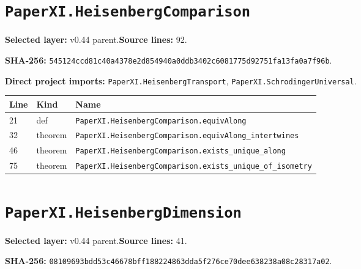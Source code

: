 \documentclass[10pt,oneside]{book}
\begin{document}
\section{\texorpdfstring{\nolinkurl{PaperXI.HeisenbergComparison}}{PaperXI.HeisenbergComparison}}\label{module:PaperXI.HeisenbergComparison}

\textbf{Selected layer:} v0.44 parent.\quad\textbf{Source lines:} 92.\par\textbf{SHA-256:} {\scriptsize\nolinkurl{545124ccd81c40a4378e2d854940a0ddb3402c6081775d92751fa13fa0a7f96b}}.


\textbf{Direct project imports:} \nolinkurl{PaperXI.HeisenbergTransport}, \nolinkurl{PaperXI.SchrodingerUniversal}.

\begin{longtable}{@{}p{}p{}p{}@{}}\toprule Line&Kind&Name\\\midrule\endhead

21&def&\nolinkurl{PaperXI.HeisenbergComparison.equivAlong}\\

32&theorem&\nolinkurl{PaperXI.HeisenbergComparison.equivAlong_intertwines}\\

46&theorem&\nolinkurl{PaperXI.HeisenbergComparison.exists_unique_along}\\

75&theorem&\nolinkurl{PaperXI.HeisenbergComparison.exists_unique_of_isometry}\\

\bottomrule\end{longtable}

\section{\texorpdfstring{\nolinkurl{PaperXI.HeisenbergDimension}}{PaperXI.HeisenbergDimension}}\label{module:PaperXI.HeisenbergDimension}

\textbf{Selected layer:} v0.44 parent.\quad\textbf{Source lines:} 41.\par\textbf{SHA-256:} {\scriptsize\nolinkurl{08109693bdd53c46678bff188224863dda5f276ce70dee638238a08c28317a02}}.

\end{document}
